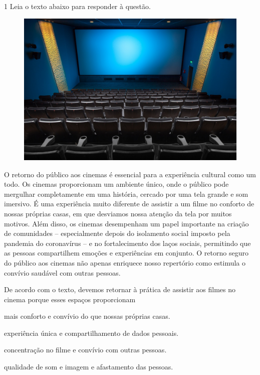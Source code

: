 \num{1} Leia o texto abaixo para responder à questão.

\begin{myquote}

\begin{figure}[H]
\centering
\includegraphics[scale=0.25]{./imgSAEB_7_POR/media/image42.png}
\end{figure}

O retorno do público aos cinemas é essencial para a experiência cultural como
um todo. Os cinemas proporcionam um ambiente único, onde o público pode
mergulhar completamente em uma história, cercado por uma tela grande e som
imersivo. É uma experiência muito diferente de assistir a um filme 
no conforto de nossas próprias casas, em que desviamos nossa atenção da tela 
por muitos motivos. Além disso, os cinemas desempenham um papel importante 
na criação de comunidades -- especialmente depois do isolamento social imposto 
pela pandemia do coronavírus -- e no fortalecimento dos laços sociais, permitindo 
que as pessoas compartilhem emoções e experiências em conjunto. O retorno seguro 
do público aos cinemas não apenas enriquece nosso repertório como estimula o convívio
saudável com outras pessoas.


\end{myquote}

De acordo com o texto, devemos retornar à prática de assistir aos filmes 
no cinema porque esses espaços proporcionam

\begin{escolha}

  \item mais conforto e convívio do que nossas próprias casas.

  \item experiência única e compartilhamento de dados pessoais. 

  \item concentração no filme e convívio com outras pessoas.

  \item qualidade de som e imagem e afastamento das pessoas. 

\end{escolha}

